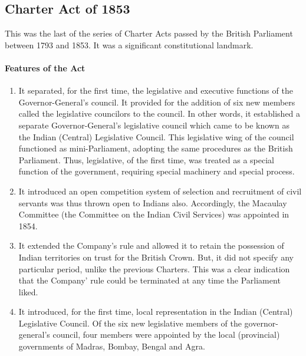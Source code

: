 \begin{multicols}{2}
\subsection{Charter Act of 1853}
This was the last of the series of Charter Acts passed by the British Parliament between 1793 and 1853. It was a significant constitutional landmark.
\paragraph{Features of the Act}

\begin{enumerate}
  \item It separated, for the first time, the legislative and executive functions of the Governor-General's council. It provided for the addition of six new members called the legislative councilors to the council. In other words, it established a separate Governor-General's legislative council which came to be known as the Indian (Central) Legislative Council. This legislative wing of the council functioned as mini-Parliament, adopting the same procedures as the British Parliament. Thus, legislative, of the first time, was treated as a special function of the government, requiring special machinery and special process.
  \item It introduced an open competition system of selection and recruitment of civil servants was thus thrown open to Indians also. Accordingly, the Macaulay Committee (the Committee on the Indian Civil Services) was appointed in 1854.
  \item It extended the Company's rule and allowed it to retain the possession of Indian territories on trust for the British Crown. But, it did not specify any particular period, unlike the previous Charters. This was a clear indication that the Company' rule could be terminated at any time the Parliament liked.
  \item It introduced, for the first time, local representation in the Indian (Central) Legislative Council. Of the six new legislative members of the governor-general's council, four members were appointed by the local (provincial) governments of Madras, Bombay, Bengal and Agra.
\end{enumerate}


\end{multicols}
